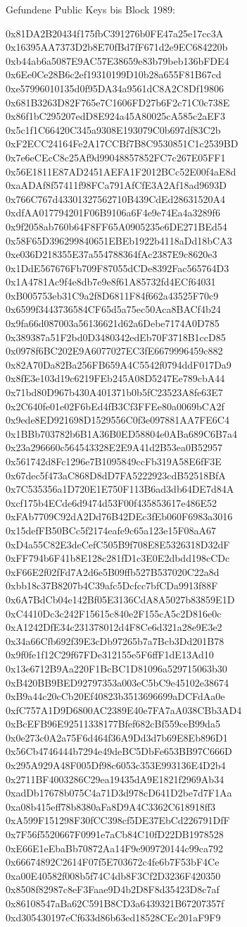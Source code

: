 \documentclass[german]{../uebung}
\begin{document}
\begin{exercise}{1}
    Gefundene Public Keys bis Block 1989:

    0x81DA2B20434f175fbC391276b0FE47a25e17cc3A
    0x16395AA7373D2b8E70fBd7fF671d2e9EC684220b
    0xb44ab6a5087E9AC57E38659e83b79beb136bFDE4
    0x6Ee0Ce28B6c2ef19310199D10b28a655F81B67cd
    0xe57996010135d0f95DA34a9561dC8A2C8Df19806
    0x681B3263D82F765e7C1606FD27b6F2c71C0c738E
    0x86f1bC295207edD8E924a45A80025cA585c2aEF3
    0x5c1f1C66420C345a9308E193079C0b697df83C2b
    0xF2ECC24164Fe2A17CCBf7B8C9530851C1c2539BD
    0x7e6eCEcC8c25Af9d99048857852FC7c267E05FF1
    0x56E1811E87AD2451AEFA1F2012BCc52E00f4aE8d
    0xaADAf8f57411f98FCa791AfCfE3A2Af18ad9693D
    0x766C767d43301327562710B439CdEd28631520A4
    0xdfAA017794201F06B9106a6F4e9e74Ea4a3289f6
    0x9f2058ab760b64F8FF65A0905235e6DE271BEd54
    0x58F65D396299840651EBEb1922b4118aDd18bCA3
    0xe036D218355E37a554788364fAc2387E9c8620e3
    0x1DdE567676Fb709F87055dCDe8392Fac565764D3
    0x1A4781Ac9f4e8db7e9e8f61A85732fd4ECf64031
    0xB005753eb31C9a2f8D6811F84f662a43525F70c9
    0x6599f3443736584CF65d5a75ec50Aca8BACf4b24
    0x9fa66d087003a56136621d62a6Debe7174A0D785
    0x389387a51F2bd0D3480342edEb70F3718B1ccD85
    0x0978f6BC202E9A6077027EC3fE6679996459c882
    0x82A70Da82Ba256FB659A4C5542f0794ddF017Da9
    0x8fE3e103d19c6219FEb245A08D5247Ee789cbA44
    0x71bd80D967b430A401371b0b5fC23523A8fe63E7
    0x2C640fe01e02F6bEd4fB3Cf3FFEe80a0069bCA2f
    0x9ede8ED921698D1529556C0f3e097881AA7FE6C4
    0x1BBb703782b6B1A36B0ED58804e0ABa689C6B7a4
    0x23a296660c564543328E2E9A41d2B53ea0B52957
    0x561742d8Fc1296e7B1095849ccFb319A58E6fF3E
    0x67dec5f473aC868D8dD7FA5222923cdB52518BfA
    0x7C535356a1D720E1E750F113B6ad3db64DE7d84A
    0xcf175b4ECde6d9474d53F00f435853617e486E52
    0xFAb7709C92dA2Dd76B42DEc3fEb060F6983a3016
    0x15defFB50BCc5f2174eafe9c65a123e15F08aA67
    0xD4a55C82E3deCefC505B9f708E8E5326318D32dF
    0xFF794b6F41b8E128c281fD1c3E0E2dbdd198cCDc
    0xF66E2f02fFd7A2d6e5B09ffb527B537020C22a8d
    0xbb18c37B8207b4C39afc5Dcfcc7bfCDa9913f88F
    0x6A7BdCb04e142Bf05E3136CdA8A5027b83859E1D
    0xC4410Dc3c242F15615c840e2F155cA5c2D816e0c
    0xA1242DfE34c231378012d4F8Ce6d321a28e9E3e2
    0x34a66Cfb692f39E3cDb97265b7a7Bcb3Dd201B78
    0x9f0fe1f12C29f67FDe312155e5F6ffF1dE13Ad10
    0x13e6712B9Aa220F1BcBC1D81096a529715063b30
    0xB420BB9BED92797353a003eC5bC9e45102e38674
    0xB9a44c20cCb20Ef40823b3513696699aDCFdAa0e
    0xfC757A1D9D6800AC2389E40e7FA7aA038CBb3AD4
    0xBcEFB96E92511338177Bfef682cBf559ceB99da5
    0x0e273c0A2a75F6d464f36A9Dd3d7b69E8Eb896D1
    0x56Cb4746444b7294e49deBC5DbFe653BB97C666D
    0x295A929A48F005Df98c6053c353E993136E4D2b4
    0x2711BF4003286C29ea19435dA9E1821f2969Ab34
    0xadDb17678b075C4a71D3d978cD641D2be7d7F1Aa
    0xa08b415eff78b8380aFa8D9A4C3362C618918ff3
    0xA599F151298F30fCC398cf5DE37EbCd226791DfF
    0x7F56f5520667F0991e7aCb84C10fD22DB1978528
    0xE66E1eEbaBb70872Aa14F9e909720144c99ca792
    0x66674892C2614F07f5E703672c4fe6b7F53bF4Ce
    0xa00E40582f008b5f74C4db8F3Cf2D3236F420350
    0x8508f82987c8eF3Faae9D4b2D8F8d35423D8c7af
    0x86108547aBa62C591B8CD3a6439321B67207357f
    0xd305430197eCf633d86b63ed18528CEc201aF9F9


\end{exercise}
\end{document}
